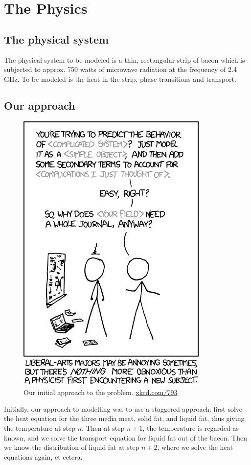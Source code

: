 \chapter{The Physics}
\section{The physical system}
The physical system to be modeled is a thin, rectangular strip of bacon which is
subjected to approx. 750 watts of microwave radiation at the frequency of 2.4
GHz. To be modeled is the heat in the strip, phase transitions and transport.

\section{Our approach}
\begin{figure}[!h]
  \begin{center}
    \includegraphics[width=0.3\linewidth]{physicists.png}
  \end{center}
  \caption{Our initial approach to the problem. \url{xkcd.com/793}}
  \label{fig:xkcd_physics}
\end{figure}

Initially, our approach to modelling was to use a staggered approach: first solve the
heat equation for the three media meat, solid fat, and liquid fat, thus giving
the temperature at step $n$. Then at step $n+1$, the temperature is regarded as
known, and we solve the transport equation for liquid fat out of the bacon. Then
we know the distribution of liquid fat at step $n+2$, where we solve the heat
equations again, et cetera.

